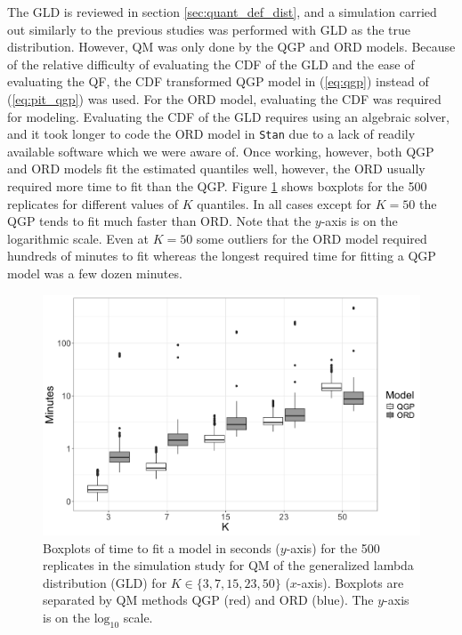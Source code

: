 \documentclass[preprint,12pt,authoryear]{elsarticle}
\newcommand{\1}[1]{\mathds{1}\left[#1\right]}
\begin{document}
The GLD is reviewed in section \ref{sec:quant_def_dist}, and a simulation 
carried out similarly to the previous studies was performed with GLD as the 
true distribution. However, QM was only done by the QGP and ORD models. 
Because of the relative difficulty of evaluating the CDF of the GLD and the 
ease of evaluating the QF, the CDF transformed QGP model in (\ref{eq:qgp}) 
instead of (\ref{eq:pit_qgp}) was used. For the ORD model, evaluating the CDF 
was required for modeling. Evaluating the CDF of the GLD requires using an 
algebraic solver, and it took longer to code the ORD model in \texttt{Stan} 
due to a lack of readily available software which we were aware of. 
Once working, however, both QGP and ORD models fit the estimated quantiles 
well, however, the ORD usually required more time to fit than the QGP. 
Figure \ref{fig:tuk_time} shows boxplots for the 500 replicates for different 
values of $K$ quantiles. In all cases except for $K=50$ the QGP tends to fit 
much faster than ORD. Note that the $y$-axis is on the logarithmic scale. Even 
at $K=50$ some outliers for the ORD model required hundreds of minutes to fit 
whereas the longest required time for fitting a QGP model was a few dozen
minutes.


\begin{figure}[hbt!]
    \centering
    \includegraphics[scale=.22]{Images/tukey_time_log10.png}
    \caption{Boxplots of time to fit a model in seconds ($y$-axis) for the 500 
    replicates in the simulation study for QM of the generalized lambda 
    distribution (GLD) for $K \in \{3, 7, 15, 23, 50\}$ ($x$-axis). Boxplots 
    are separated by QM methods QGP (red) and ORD (blue). The $y$-axis is on 
    the $\text{log}_{10}$ scale.}
    \label{fig:tuk_time}
\end{figure}
\end{document}
